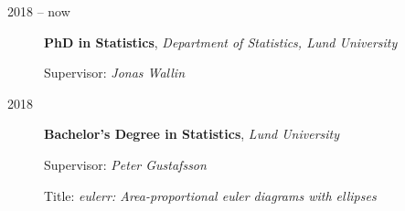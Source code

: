\documentclass[
  10pt,
  headsepline=true,
  english,
  DIV=12
]{scrartcl}
\renewcommand*{%
  \mkbibnamegiven
}[1]{\ifitemannotation{highlight}{\textbf{#1}}{#1}}
\renewcommand*{%
  \mkbibnamefamily
}[1]{\ifitemannotation{highlight}{\textbf{#1}}{#1}}
\begin{document}
\begin{description}
  \item[2018 -- now] {
    \textbf{PhD in Statistics}, \emph{Department of Statistics, Lund
      University}

    Supervisor: \emph{Jonas Wallin}
    }

  \item[2018] {
    \textbf{Bachelor's Degree in Statistics}, \emph{Lund University}

    Supervisor: \emph{Peter Gustafsson}

    Title: \emph{eulerr: Area-proportional euler diagrams with ellipses}
    }






\end{description}





\end{document}
